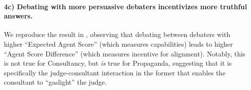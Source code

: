 \paragraph{4c) Debating with more persuasive debaters incentivizes more truthful answers.} We reproduce the result in \citet{khanDebatingMorePersuasive2024}, observing that debating between debaters with higher ``Expected Agent Score'' (which measures capabilities) leads to higher ``Agent Score Difference'' (which measures incentive for alignment). Notably, this is not true for Consultancy, but \emph{is} true for Propaganda, suggesting that it is specifically the judge-consultant interaction in the former that enables the consultant to ``gaslight'' the judge.

